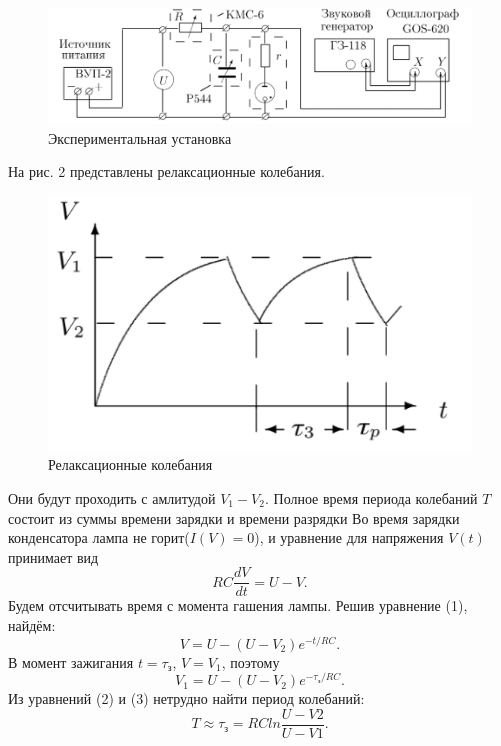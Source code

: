 \documentclass[a4paper,12pt]{article}
\begin{document}
\begin{figure}[!h]
\centering
\includegraphics[width=0.9\linewidth]{установка.png}
\caption{Экспериментальная установка}
\label{fig:mpr}
\end{figure}

На рис. 2 представлены релаксационные колебания.
\begin{figure}[!h]
\centering
\includegraphics[width=0.6\linewidth]{Релаксационные.png}
\caption{Релаксационные колебания}
\label{fig:mpr}
\end{figure}
Они будут проходить с амлитудой $V_1 - V_2$. Полное время периода колебаний $T$ состоит из суммы времени зарядки и времени разрядки Во время зарядки конденсатора лампа не горит($I(V)=0$), и уравнение для напряжения $V(t)$ принимает вид
\begin{equation}
    RC\frac{dV}{dt}=U-V.
\end{equation}
Будем отсчитывать время с момента гашения лампы. Решив уравнение (1), найдём:
\begin{equation}
    V = U - (U-V_2)e^{-t/RC}.
\end{equation}
В момент зажигания $t=\tau_{з}$, $V=V_1$, поэтому
\begin{equation}
    V_1 = U-(U-V_2)e^{-\tau_з /RC}.
\end{equation}
Из уравнений (2) и (3) нетрудно найти период колебаний:
\begin{equation}
    T\approx \tau_з = RCln\frac{U-V2}{U-V1}.
\end{equation}
\end{document}
